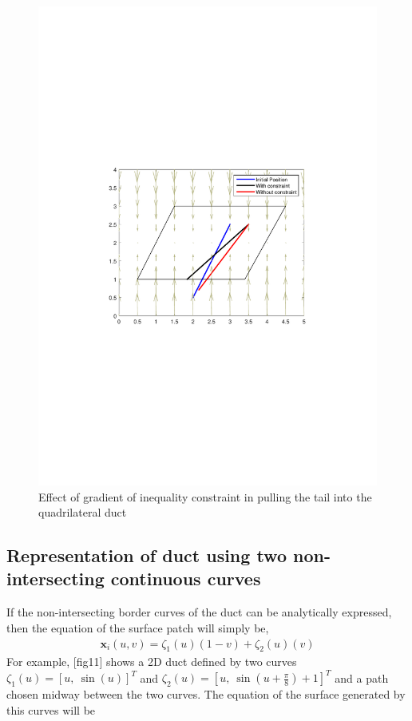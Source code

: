 \documentclass[12pt,a4]{article}
\begin{document}
\begin{figure}[h!]
\centering
\includegraphics[scale=0.5]{figures/fig10b.pdf}
\caption{ Effect of gradient of inequality constraint in pulling the tail into the quadrilateral duct \label{fig:quadgradient}}
\end{figure}


\subsection{Representation of duct using two non-intersecting continuous curves}
If the non-intersecting border curves of the duct can be analytically expressed, then the equation of the surface patch will simply be,
\begin{align}
\mathbf{x}_i(u,v)= \zeta_1(u)\left(1-{v}\right) +\zeta_2(u)\left({v}\right)
\end{align}
For example, [fig11] shows a 2D duct defined by two curves $\zeta_1(u) = \left[u,~\sin\left(u \right)\right]^T$ and $\zeta_2(u) = \left[u,~\sin\left(u +\frac{\pi}{8}\right)+1\right]^T$ and a path chosen midway between the two curves. The equation of the surface generated by this curves will be
\end{document}
